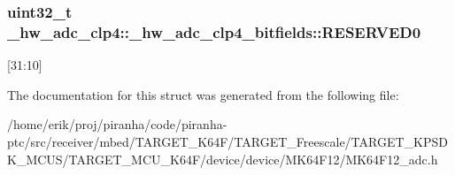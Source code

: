 \subsubsection[{\texorpdfstring{R\+E\+S\+E\+R\+V\+E\+D0}{RESERVED0}}]{\setlength{\rightskip}{0pt plus 5cm}uint32\+\_\+t \+\_\+hw\+\_\+adc\+\_\+clp4\+::\+\_\+hw\+\_\+adc\+\_\+clp4\+\_\+bitfields\+::\+R\+E\+S\+E\+R\+V\+E\+D0}\hypertarget{struct__hw__adc__clp4_1_1__hw__adc__clp4__bitfields_ab000c0d9d5ab772b3f06a9a2a1c48593}{}\label{struct__hw__adc__clp4_1_1__hw__adc__clp4__bitfields_ab000c0d9d5ab772b3f06a9a2a1c48593}
\mbox{[}31\+:10\mbox{]} 

The documentation for this struct was generated from the following file\+:\begin{DoxyCompactItemize}
\item 
/home/erik/proj/piranha/code/piranha-\/ptc/src/receiver/mbed/\+T\+A\+R\+G\+E\+T\+\_\+\+K64\+F/\+T\+A\+R\+G\+E\+T\+\_\+\+Freescale/\+T\+A\+R\+G\+E\+T\+\_\+\+K\+P\+S\+D\+K\+\_\+\+M\+C\+U\+S/\+T\+A\+R\+G\+E\+T\+\_\+\+M\+C\+U\+\_\+\+K64\+F/device/device/\+M\+K64\+F12/M\+K64\+F12\+\_\+adc.\+h\end{DoxyCompactItemize}
